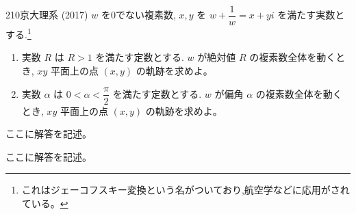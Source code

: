 \begin{prob}{210}{\maru}{京大理系 (2017)}
 $w$ を0でない複素数, $x,y$ を $w+\dfrac{1}{w}=x+yi$ を満たす実数とする.\footnote{これはジェーコフスキー変換という名がついており,航空学などに応用がされている。}
 \begin{enumerate}
  \item 実数 $R$ は $R>1$ を満たす定数とする. $w$ が絶対値 $R$ の複素数全体を動くとき, $xy$ 平面上の点 $(x,y)$ の軌跡を求めよ。
  \item 実数 $\alpha$ は $0<\alpha<\dfrac{\pi}{2}$ を満たす定数とする. $w$ が偏角 $\alpha$ の複素数全体を動くとき, $xy$ 平面上の点 $(x,y)$ の軌跡を求めよ。
 \end{enumerate}
\end{prob}
ここに解答を記述。

ここに解答を記述。